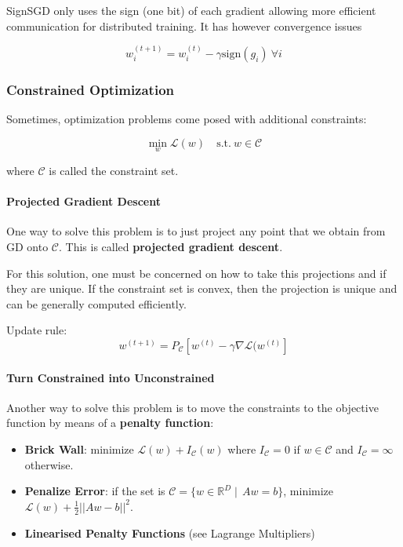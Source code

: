 \documentclass{article}
\newcommand{\R}{\mathbb{R}}
\newcommand{\loss}{\mathcal{L}}
\begin{document}
SignSGD only uses the sign (one bit) of each gradient allowing more efficient communication for distributed training. 
It has however convergence issues

$$
w_i^{(t+1)} = w_i^{(t)} - \gamma \text{sign}(g_i) \ \forall i
$$

\subsubsection{Constrained Optimization}

Sometimes, optimization problems come posed with additional constraints:

$$
\min_{w} \loss(w) \quad \text{s.t.} \ w \in \mathcal{C}
$$

where $\mathcal{C}$ is called the constraint set.

\paragraph{Projected Gradient Descent}

One way to solve this problem is to just project any point that we obtain from GD onto $\mathcal{C}$.
This is called \textbf{projected gradient descent}.

For this solution, one must be concerned on how to take this projections and if they are unique.
If the constraint set is convex, then the projection is unique and can be generally computed efficiently.

Update rule:
$$
w^{(t+1)} = P_\mathcal{C} \left[ w^{(t)} - \gamma \nabla \loss(w^{(t)} \right]
$$

\paragraph{Turn Constrained into Unconstrained}

Another way to solve this problem is to move the constraints to the objective function by means of a \textbf{penalty function}:

\begin{itemize}
\item \textbf{Brick Wall}: minimize $\loss(w) + I_\mathcal{C}(w)$ where $I_\mathcal{C} = 0$ if $w \in \mathcal{C}$ and $I_\mathcal{C} = \infty$ otherwise.
    \item \textbf{Penalize Error}: if the set is $\mathcal{C} = \{ w \in \R^D \mid \, Aw = b \}$, minimize $\loss(w) + \frac{1}{2} ||Aw - b||^2$.
    \item \textbf{Linearised Penalty Functions} (see Lagrange Multipliers)
\end{itemize}
\end{document}
